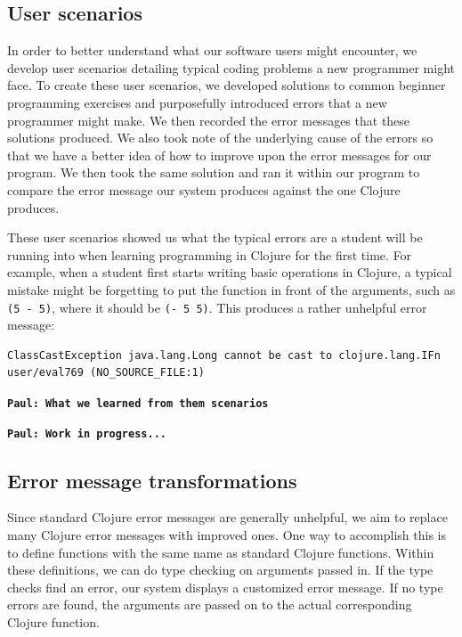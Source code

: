 \documentclass[12pt]{article}
\newcommand{\comment}[1]{{\bf \tt  {#1}}}
\newcommand{\pscomment}[1]{\textcolor{Coquelicot}{\comment{Paul: {#1}}}}
\begin{document}
\subsection{User scenarios}\label{sec:scenarios}

In order to better understand what our software users might encounter, we develop user scenarios detailing typical coding problems a new programmer might face.
To create these user scenarios, we developed solutions to common beginner programming exercises and purposefully introduced errors that a new programmer might make.
We then recorded the error messages that these solutions produced.
We also took note of the underlying cause of the errors so that we have a better idea of how to improve upon the error messages for our program.
We then took the same solution and ran it within our program to compare the error message our system produces against the one Clojure produces.  

These user scenarios showed us what the typical errors are a student will be running into when learning programming in Clojure for the first time.
For example, when a student first starts writing basic operations in Clojure, a typical mistake might be forgetting to put the function in front of the arguments, such as \texttt{(5 - 5)}, where it should be \texttt{(- 5 5)}. 
This produces a rather unhelpful error message: 

\begin{verbatim}
ClassCastException java.lang.Long cannot be cast to clojure.lang.IFn
user/eval769 (NO_SOURCE_FILE:1)
\end{verbatim}

\pscomment{What we learned from them scenarios}

\pscomment{Work in progress...}

\subsection{Error message transformations}\label{sec:transform}

Since standard Clojure error messages are generally unhelpful, we aim to replace many Clojure error messages with improved ones.
One way to accomplish this is to define functions with the same name as standard Clojure functions.
Within these definitions, we can do type checking on arguments passed in.
If the type checks find an error, our system displays a customized error message.
If no type errors are found, the arguments are passed on to the actual corresponding Clojure function.
\end{document}

